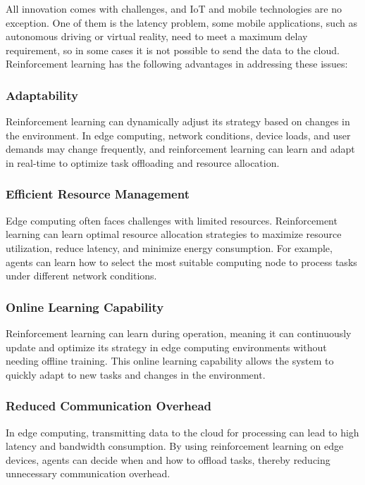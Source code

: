 \documentclass[journal]{IEEEtran}
\begin{document}
All innovation comes with challenges, and IoT and mobile technologies are no exception. One of them is the latency problem, some mobile applications, such as autonomous driving or virtual reality, need to meet a maximum delay requirement, so in some cases it is not possible to send the data to the cloud. Reinforcement learning has the following advantages in addressing these issues:

\subsubsection{Adaptability}
Reinforcement learning can dynamically adjust its strategy based on changes in the environment. In edge computing, network conditions, device loads, and user demands may change frequently, and reinforcement learning can learn and adapt in real-time to optimize task offloading and resource allocation.

\subsubsection{Efficient Resource Management}
Edge computing often faces challenges with limited resources. Reinforcement learning can learn optimal resource allocation strategies to maximize resource utilization, reduce latency, and minimize energy consumption. For example, agents can learn how to select the most suitable computing node to process tasks under different network conditions.

\subsubsection{Online Learning Capability}
Reinforcement learning can learn during operation, meaning it can continuously update and optimize its strategy in edge computing environments without needing offline training. This online learning capability allows the system to quickly adapt to new tasks and changes in the environment.

\subsubsection{Reduced Communication Overhead}
In edge computing, transmitting data to the cloud for processing can lead to high latency and bandwidth consumption. By using reinforcement learning on edge devices, agents can decide when and how to offload tasks, thereby reducing unnecessary communication overhead.
\end{document}

